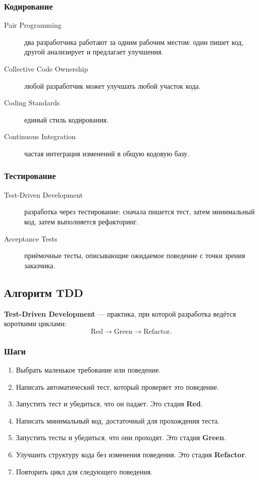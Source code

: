 \documentclass[12pt,a4paper]{article}
\begin{document}
\subsubsection{Кодирование}

\begin{description}
    \item[Pair Programming] два разработчика работают за одним рабочим местом: один пишет код, другой анализирует и предлагает улучшения.
    \item[Collective Code Ownership] любой разработчик может улучшать любой участок кода.
    \item[Coding Standards] единый стиль кодирования.
    \item[Continuous Integration] частая интеграция изменений в общую кодовую базу.
\end{description}

\subsubsection{Тестирование}

\begin{description}
    \item[Test-Driven Development] разработка через тестирование: сначала пишется тест, затем минимальный код, затем выполняется рефакторинг.
    \item[Acceptance Tests] приёмочные тесты, описывающие ожидаемое поведение с точки зрения заказчика.
\end{description}

\subsection{Алгоритм TDD}

\textbf{Test-Driven Development} --- практика, при которой разработка ведётся короткими циклами:
\[
\text{Red} \rightarrow \text{Green} \rightarrow \text{Refactor}.
\]

\subsubsection*{Шаги}

\begin{enumerate}
    \item Выбрать маленькое требование или поведение.
    \item Написать автоматический тест, который проверяет это поведение.
    \item Запустить тест и убедиться, что он падает. Это стадия \textbf{Red}.
    \item Написать минимальный код, достаточный для прохождения теста.
    \item Запустить тесты и убедиться, что они проходят. Это стадия \textbf{Green}.
    \item Улучшить структуру кода без изменения поведения. Это стадия \textbf{Refactor}.
    \item Повторить цикл для следующего поведения.
\end{enumerate}
\end{document}
